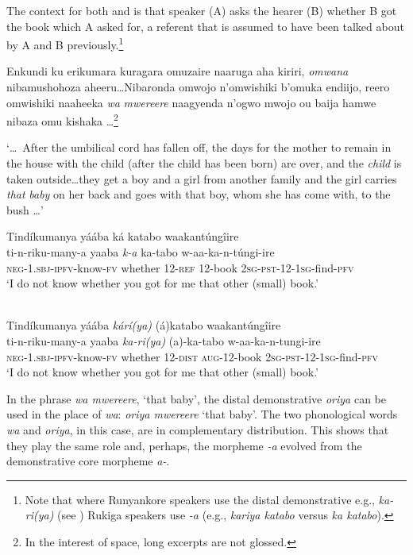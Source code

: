 \documentclass[output=paper 		  ]{langscibook}
\begin{document}
The context for both  and  is that speaker (A) asks the hearer (B) whether B got the book which A asked for, a referent that is assumed to have been talked about by A and B previously.\footnote{Note that where Runyankore speakers use the distal demonstrative e.g., \textit{ka-ri(ya)} (see ) Rukiga speakers use \textit{-a} (e.g., \textit{kariya katabo} versus \textit{ka katabo}).}

\ea%
    \label{ex:asiimwe:12} \citet[215]{Asiimwe2014}

          Enkundi ku erikumara kuragara omuzaire naaruga aha kiriri, \emph{omwana} nibamushohoza   aheeru…Nibaronda omwojo n’omwishiki b’omuka endiijo, reero omwishiki naaheeka \emph{wa}   \emph{mwereere} naagyenda n’ogwo mwojo ou baija hamwe nibaza omu kishaka \ldots \citep[109]{Karwemera1994}\footnote{In the interest of space, long excerpts are not glossed.}

‘\ldots\, After the umbilical cord has fallen off, the days for the mother to remain in the house with the child (after the child has been born) are over, and the \emph{child} is taken outside…they get a boy and   a girl from another family and the girl carries \emph{that} \emph{baby} on her back and goes with that boy, whom she has come with, to the bush \ldots'
\z

\ea%
    \label{ex:asiimwe:13}
    \ea\label{ex:asiimwe:13a}  Tindíkumanya yáába ká katabo waakantúngîire\\
    \gll ti-n-riku-many-a  yaaba  \emph{k-a}  ka-tabo  w-aa-ka-n-túngi-ire\\
    \textsc{neg-1.sbj-ipfv}{}-know-\textsc{fv}  whether  12-\textsc{ref}  12-book  \textsc{2sg-pst-12-1sg}{}-find-\textsc{pfv}\\
  \glt ‘I do not know whether you got for me that other (small) book.’

\ex\label{ex:asiimwe:13b}  \citet[205]{Asiimwe2014}\\
Tindíkumanya yáába \emph{kárí(ya)} (á)katabo waakantúngîire\\
  \gll ti-n-riku-many-a  yaaba  \emph{ka-ri(ya)}  (a)-ka-tabo  w-aa-ka-n-tungi-ire\\
  \textsc{neg-1.sbj-ipfv}{}-know-\textsc{fv}  whether  12-\textsc{dist}  \textsc{aug}{}-12-book  \textsc{2sg-pst-12-1sg}{}-find-\textsc{pfv}\\
  \glt ‘I do not know whether you got for me that other (small) book.’
    \z
\z

In the phrase \textit{wa mwereere}, ‘that baby’, the distal demonstrative \textit{oriya} can be used in the place of \textit{wa}: \textit{oriya mwereere} ‘that baby’. The two phonological words \textit{wa} and \textit{oriya}, in this case, are in complementary distribution. This shows that they play the same role and, perhaps, the morpheme \textit{{}-a} evolved from the demonstrative core morpheme \textit{a-}.
\end{document}

